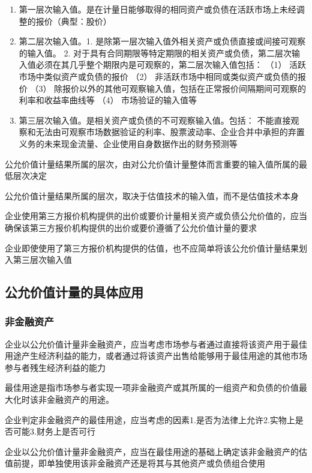 \documentclass[UTF8,12pt]{ctexart}
\numberwithin{equation}{section} %
\numberwithin{figure}{section}
\numberwithin{table}{section}
\begin{document}
	\begin{enumerate}
		\item 第一层次输入值。是在计量日能够取得的相同资产或负债在活跃市场上未经调整的报价（典型：股价）
		
		\item 第二层次输入值。1.	是除第一层次输入值外相关资产或负债直接或间接可观察的输入值。
		2.	对于具有合同期限等特定期限的相关资产或负债，第二层次输入值必须在其几乎整个期限内是可观察的，第二层次输入值包括：
		（1）	活跃市场中类似资产或负债的报价
		（2）	非活跃市场中相同或类似资产或负债的报价
		（3）	除报价以外的其他可观察输入值，包括在正常报价间隔期间可观察的利率和收益率曲线等
		（4）	市场验证的输入值等
		
		\item 第三层次输入值。是相关资产或负债的不可观察输入值。包括：
		不能直接观察和无法由可观察市场数据验证的利率、股票波动率、企业合并中承担的弃置义务的未来现金流量、企业使用自身数据作出的财务预测等
		
	\end{enumerate}
	
	公允价值计量结果所属的层次，由对公允价值计量整体而言重要的输入值所属的最低层次决定
	
	公允价值计量结果所属的层次，取决于估值技术的输入值，而不是估值技术本身
	
	企业使用第三方报价机构提供的出价或要价计量相关资产或负债公允价值的，应当确保该第三方报价机构提供的出价或要价遵循了公允价值计量的要求
	
	企业即使使用了第三方报价机构提供的估值，也不应简单将该公允价值计量结果划入第三层次输入值
	
	\subsection{公允价值计量的具体应用}
	\subsubsection{非金融资产}
	企业以公允价值计量非金融资产，应当考虑市场参与者通过直接将该资产用于最佳用途产生经济利益的能力，或者通过将该资产出售给能够用于最佳用途的其他市场参与者残生经济利益的能力
	
	最佳用途是指市场参与者实现一项非金融资产或其所属的一组资产和负债的价值最大化时该非金融资产的用途。
	
	企业判定非金融资产的最佳用途，应当考虑的因素1.是否为法律上允许2.实物上是否可能3.财务上是否可行
	
	企业以公允价值计量非金融资产，应当在最佳用途的基础上确定该非金融资产的估值前提，即单独使用该非金融资产还是将其与其他资产或负债组合使用
	
\end{document}
